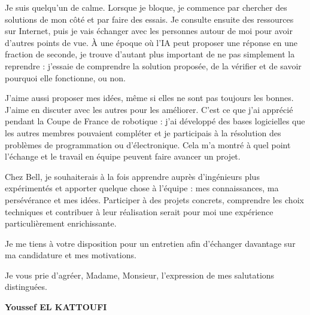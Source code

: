 \documentclass[10pt,a4paper]{article}
\begin{document}
Je suis quelqu'un de calme. Lorsque je bloque, je commence par chercher des solutions de mon côté et par faire des essais. Je consulte ensuite des ressources sur Internet, puis je vais échanger avec les personnes autour de moi pour avoir d'autres points de vue. À une époque où l'IA peut proposer une réponse en une fraction de seconde, je trouve d'autant plus important de ne pas simplement la reprendre : j'essaie de comprendre la solution proposée, de la vérifier et de savoir pourquoi elle fonctionne, ou non.

J'aime aussi proposer mes idées, même si elles ne sont pas toujours les bonnes. J'aime en discuter avec les autres pour les améliorer. C'est ce que j'ai apprécié pendant la Coupe de France de robotique : j'ai développé des bases logicielles que les autres membres pouvaient compléter et je participais à la résolution des problèmes de programmation ou d'électronique. Cela m'a montré à quel point l'échange et le travail en équipe peuvent faire avancer un projet.

Chez Bell, je souhaiterais à la fois apprendre auprès d'ingénieurs plus expérimentés et apporter quelque chose à l'équipe : mes connaissances, ma persévérance et mes idées. Participer à des projets concrets, comprendre les choix techniques et contribuer à leur réalisation serait pour moi une expérience particulièrement enrichissante.

Je me tiens à votre disposition pour un entretien afin d'échanger davantage sur ma candidature et mes motivations.

Je vous prie d'agréer, Madame, Monsieur, l'expression de mes salutations distinguées.

\vspace{2pt}
{\raggedleft\bfseries\color{bleu}Youssef EL KATTOUFI\par}
\end{document}
